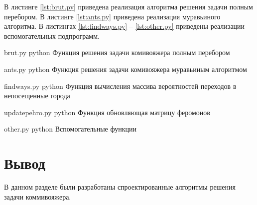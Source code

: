 В листинге \ref{lst:brut.py} приведена реализация алгоритма решения задачи полным перебором. 
В листинге \ref{lst:ants.py} приведена реализация муравьиного алгоритма.
В листингах \ref{lst:findways.py} -- \ref{lst:other.py} приведены реализации вспомогательных подпрограмм.

\clearpage
{}
{brut.py} %
{python} %
{Функция решения задачи комивояжера полным перебором} %

\clearpage

{ants.py} %
{python} %
{Функция решения задачи комивояжера муравьиным алгоритмом} %

\clearpage

{findways.py} %
{python} %
{Функция вычисления массива вероятностей переходов в непосещенные города} %

\clearpage

{updatepehro.py} %
{python} %
{Функция обновляющая матрицу феромонов} %

\clearpage

{other.py} %
{python} %
{Вспомогательные функции} %

\clearpage

\section*{Вывод}
В данном разделе были разработаны спроектированные алгоритмы решения задачи коммивояжера.